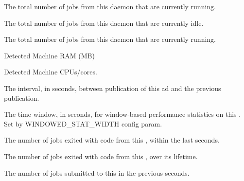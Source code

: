 \begin{description}
\item[\AdAttr{TotalRunningJobs}:] The total number of jobs from this
   daemon that are currently running.

\item[\AdAttr{TotalSchedulerIdleJobs}:] The total number of 
    jobs from this
   daemon that are currently idle.

\item[\AdAttr{TotalSchedulerRunningJobs}:] The total number of 
    jobs from this
   daemon that are currently running.

\item[\AdAttr{DetectedMemory}:] Detected Machine RAM (MB)

\item[\AdAttr{DetectedCpus}:] Detected Machine CPUs/cores.

\item[\AdAttr{UpdateInterval}:] The interval, in seconds,
  between publication of this  ad and
  the previous publication.

\item[\AdAttr{WindowedStatWidth}:] The time window, in seconds,
  for window-based performance statistics on this
  .  Set by WINDOWED\_STAT\_WIDTH config param.

\item[\AdAttr{ExitCode<N>}:] The number of jobs exited with code
   from this , within the last 
   seconds.

\item[\AdAttr{ExitCodeCumulative<N>}:] The number of jobs exited 
  with code  from this , over its lifetime.

\item[\AdAttr{JobsSubmitted}:] The number of jobs submitted to
  this  in the previous 
  seconds.


\end{description}
